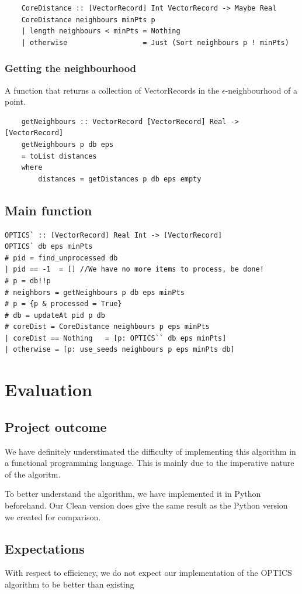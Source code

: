 \documentclass[12pt,a4paper]{article}
\begin{document}
\begin{verbatim}
    CoreDistance :: [VectorRecord] Int VectorRecord -> Maybe Real
    CoreDistance neighbours minPts p
    | length neighbours < minPts = Nothing
    | otherwise                  = Just (Sort neighbours p ! minPts)
\end{verbatim}

\subsubsection{Getting the neighbourhood}
A function that returns a collection of VectorRecords in the $\epsilon$-neighbourhood of a point.
\begin{verbatim}
    getNeighbours :: VectorRecord [VectorRecord] Real -> [VectorRecord]
    getNeighbours p db eps
    = toList distances
    where
        distances = getDistances p db eps empty
\end{verbatim}

\subsection{Main function}
\begin{verbatim}
OPTICS` :: [VectorRecord] Real Int -> [VectorRecord]
OPTICS` db eps minPts
# pid = find_unprocessed db
| pid == -1  = [] //We have no more items to process, be done!
# p = db!!p
# neighbors = getNeighbours p db eps minPts
# p = {p & processed = True}
# db = updateAt pid p db
# coreDist = CoreDistance neighbours p eps minPts
| coreDist == Nothing   = [p: OPTICS`` db eps minPts]
| otherwise = [p: use_seeds neighbours p eps minPts db]
\end{verbatim}

\clearpage
\section{Evaluation}
\subsection{Project outcome}
We have definitely understimated the difficulty of implementing this algorithm in a functional programming language. This is mainly due to the imperative nature of the algoritm.

To better understand the algorithm, we have implemented it in Python beforehand. Our Clean version does give the same result as the Python version we created for comparison.

\subsection{Expectations}
With respect to efficiency, we do not expect our implementation of the OPTICS algorithm to be better than existing 
\end{document}

